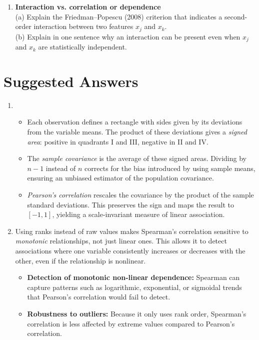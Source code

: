 \documentclass[11pt]{article}
\begin{document}
\begin{enumerate}[label=\textbf{Q\arabic*.}, itemsep=1em]
  \item \textbf{Interaction vs. correlation or dependence} \\
        (a) Explain the Friedman–Popescu (2008) criterion that indicates a second-order interaction between two features $x_j$ and $x_k$. \\
        (b) Explain in one sentence why an interaction can be present even when $x_j$ and $x_k$ are statistically independent.

\end{enumerate}

\newpage
\section*{Suggested Answers}

\begin{enumerate}[label=\textbf{Q\arabic*.}, itemsep=1em]

  \item \begin{itemize}
  \item Each observation defines a rectangle with sides given by its deviations from the variable means. The product of these deviations gives a \emph{signed area}: positive in quadrants I and III, negative in II and IV.

  \item The \emph{sample covariance} is the average of these signed areas. Dividing by $n - 1$ instead of $n$ corrects for the bias introduced by using sample means, ensuring an unbiased estimator of the population covariance.

  \item \emph{Pearson’s correlation} rescales the covariance by the product of the sample standard deviations. This preserves the sign and maps the result to $[-1, 1]$, yielding a scale-invariant measure of linear association.
\end{itemize}


  \item Using ranks instead of raw values makes Spearman’s correlation sensitive to \emph{monotonic} relationships, not just linear ones. This allows it to detect associations where one variable consistently increases or decreases with the other, even if the relationship is nonlinear.
\begin{itemize}
  \item \textbf{Detection of monotonic non-linear dependence:} Spearman can capture patterns such as logarithmic, exponential, or sigmoidal trends that Pearson's correlation would fail to detect.
  \item \textbf{Robustness to outliers:} Because it only uses rank order, Spearman’s correlation is less affected by extreme values compared to Pearson’s correlation.
\end{itemize}


\end{enumerate}
\end{document}
